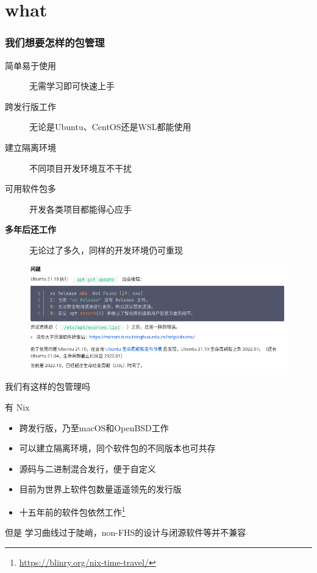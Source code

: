 \documentclass{ctexbeamer}
\begin{document}
\section{what}

\begin{frame}
  \frametitle{我们想要怎样的包管理}
  \begin{description}
    \item[简单易于使用] 无需学习即可快速上手
    \item[跨发行版工作] 无论是Ubuntu、CentOS还是WSL都能使用
    \item[建立隔离环境] 不同项目开发环境互不干扰
    \item[可用软件包多] 开发各类项目都能得心应手
    \item[\textbf{多年后还工作}] 无论过了多久，同样的开发环境仍可重现
  \end{description}
  \begin{figure}
    \includegraphics[width=\linewidth]{./csdn-404.png}
  \end{figure}
\end{frame}

\begin{frame}{我们有这样的包管理吗}
  \begin{exampleblock}{有}
    Nix
  \end{exampleblock}
  \begin{itemize}
    \item 跨发行版，乃至macOS和OpenBSD工作
    \item 可以建立隔离环境，同个软件包的不同版本也可共存
    \item 源码与二进制混合发行，便于自定义
    \item 目前为世界上软件包数量遥遥领先的发行版
    \item 十五年前的软件包依然工作\footnote{\url{https://blinry.org/nix-time-travel/}}
  \end{itemize}
  \begin{alertblock}{但是}
    学习曲线过于陡峭，non-FHS的设计与闭源软件等并不兼容
  \end{alertblock}
\end{frame}
\end{document}
